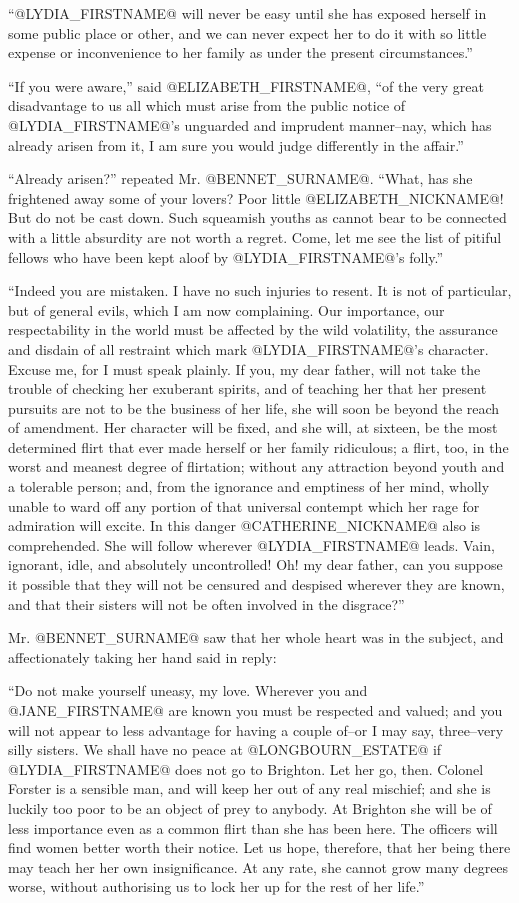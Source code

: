 ``@LYDIA_FIRSTNAME@ will never be easy until she has exposed herself in some public
place or other, and we can never expect her to do it with so
little expense or inconvenience to her family as under the present
circumstances.''

``If you were aware,'' said @ELIZABETH_FIRSTNAME@, ``of the very great disadvantage to
us all which must arise from the public notice of @LYDIA_FIRSTNAME@'s unguarded and
imprudent manner--nay, which has already arisen from it, I am sure you
would judge differently in the affair.''

``Already arisen?'' repeated Mr. @BENNET_SURNAME@. ``What, has she frightened away
some of your lovers? Poor little @ELIZABETH_NICKNAME@! But do not be cast down. Such
squeamish youths as cannot bear to be connected with a little absurdity
are not worth a regret. Come, let me see the list of pitiful fellows who
have been kept aloof by @LYDIA_FIRSTNAME@'s folly.''

``Indeed you are mistaken. I have no such injuries to resent. It is not
of particular, but of general evils, which I am now complaining. Our
importance, our respectability in the world must be affected by the
wild volatility, the assurance and disdain of all restraint which mark
@LYDIA_FIRSTNAME@'s character. Excuse me, for I must speak plainly. If you, my dear
father, will not take the trouble of checking her exuberant spirits, and
of teaching her that her present pursuits are not to be the business of
her life, she will soon be beyond the reach of amendment. Her character
will be fixed, and she will, at sixteen, be the most determined flirt
that ever made herself or her family ridiculous; a flirt, too, in the
worst and meanest degree of flirtation; without any attraction beyond
youth and a tolerable person; and, from the ignorance and emptiness
of her mind, wholly unable to ward off any portion of that universal
contempt which her rage for admiration will excite. In this danger
@CATHERINE_NICKNAME@ also is comprehended. She will follow wherever @LYDIA_FIRSTNAME@ leads. Vain,
ignorant, idle, and absolutely uncontrolled! Oh! my dear father, can you
suppose it possible that they will not be censured and despised wherever
they are known, and that their sisters will not be often involved in the
disgrace?''

Mr. @BENNET_SURNAME@ saw that her whole heart was in the subject, and
affectionately taking her hand said in reply:

``Do not make yourself uneasy, my love. Wherever you and @JANE_FIRSTNAME@ are known
you must be respected and valued; and you will not appear to less
advantage for having a couple of--or I may say, three--very silly
sisters. We shall have no peace at @LONGBOURN_ESTATE@ if @LYDIA_FIRSTNAME@ does not go to
Brighton. Let her go, then. Colonel Forster is a sensible man, and will
keep her out of any real mischief; and she is luckily too poor to be an
object of prey to anybody. At Brighton she will be of less importance
even as a common flirt than she has been here. The officers will find
women better worth their notice. Let us hope, therefore, that her being
there may teach her her own insignificance. At any rate, she cannot grow
many degrees worse, without authorising us to lock her up for the rest
of her life.''

